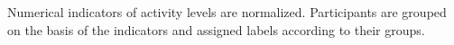Numerical indicators of activity levels are normalized.
Participants are grouped on the basis of the indicators and assigned labels according to their groups.
